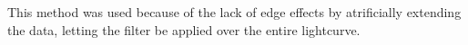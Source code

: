 This method was used because of the lack of edge effects by atrificially extending the data, letting the filter be applied over the entire lightcurve.
